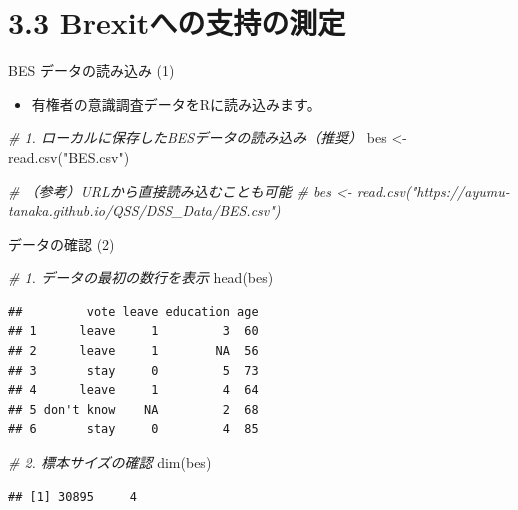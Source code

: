 \documentclass[
  ignorenonframetext,
]{beamer}
\newenvironment{Shaded}{\begin{snugshade}}{\end{snugshade}}
\newcommand{\CommentTok}[1]{\textcolor[rgb]{0.56,0.35,0.01}{\textit{#1}}}
\newcommand{\FunctionTok}[1]{\textcolor[rgb]{0.00,0.00,0.00}{#1}}
\newcommand{\NormalTok}[1]{#1}
\newcommand{\OtherTok}[1]{\textcolor[rgb]{0.56,0.35,0.01}{#1}}
\newcommand{\StringTok}[1]{\textcolor[rgb]{0.31,0.60,0.02}{#1}}
\providecommand{\tightlist}{%
  \setlength{\itemsep}{0pt}\setlength{\parskip}{0pt}}
\begin{document}
\hypertarget{brexitux3078ux306eux652fux6301ux306eux6e2cux5b9a}{%
\section{3.3
Brexitへの支持の測定}\label{brexitux3078ux306eux652fux6301ux306eux6e2cux5b9a}}

\begin{frame}[fragile]{BES データの読み込み (1)}
\protect\hypertarget{bes-ux30c7ux30fcux30bfux306eux8aadux307fux8fbcux307f-1}{}
\begin{itemize}
\tightlist
\item
  有権者の意識調査データをRに読み込みます。
\end{itemize}

\scriptsize

\begin{Shaded}
\begin{Highlighting}[]
\CommentTok{\# 1. ローカルに保存したBESデータの読み込み（推奨）}
\NormalTok{bes }\OtherTok{\textless{}{-}} \FunctionTok{read.csv}\NormalTok{(}\StringTok{"BES.csv"}\NormalTok{)}

\CommentTok{\# （参考）URLから直接読み込むことも可能}
\CommentTok{\# bes \textless{}{-} read.csv("https://ayumu{-}tanaka.github.io/QSS/DSS\_Data/BES.csv")}
\end{Highlighting}
\end{Shaded}

\normalsize
\end{frame}

\begin{frame}[fragile]{データの確認 (2)}
\protect\hypertarget{ux30c7ux30fcux30bfux306eux78baux8a8d-2}{}
\scriptsize

\begin{Shaded}
\begin{Highlighting}[]
\CommentTok{\# 1. データの最初の数行を表示}
\FunctionTok{head}\NormalTok{(bes)}
\end{Highlighting}
\end{Shaded}

\begin{verbatim}
##         vote leave education age
## 1      leave     1         3  60
## 2      leave     1        NA  56
## 3       stay     0         5  73
## 4      leave     1         4  64
## 5 don't know    NA         2  68
## 6       stay     0         4  85
\end{verbatim}

\begin{Shaded}
\begin{Highlighting}[]
\CommentTok{\# 2. 標本サイズの確認}
\FunctionTok{dim}\NormalTok{(bes)}
\end{Highlighting}
\end{Shaded}

\begin{verbatim}
## [1] 30895     4
\end{verbatim}

\normalsize
\end{frame}
\end{document}
